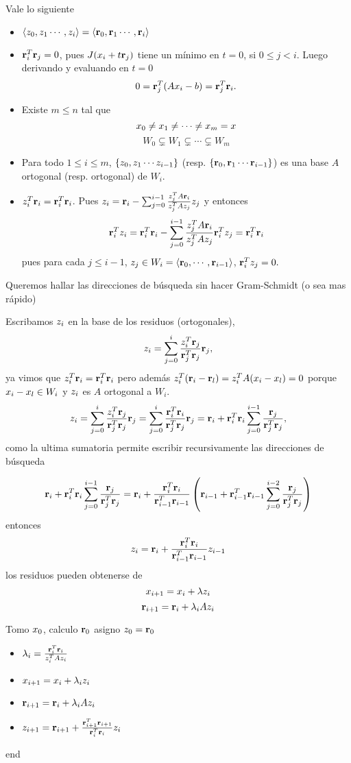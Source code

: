 Vale lo siguiente
\begin{itemize}
 \item $\langle \zb_0, \zb_1\cdots ,\zb_i\rangle =\langle \rb_0, \rb_1\cdots ,
 \rb_i\rangle$
\item $\mathbf{r}_i^T\mathbf{r}_j=0$, pues $J(\xb_i+t\rb_j)$ tiene un mínimo en $t=0$, si $0\le j<i$. Luego derivando y evaluando en $t=0$
$$
0=\rb_j^T(\Ab\xb_i-\bb)=\rb_j^T\rb_i.
$$
\item Existe $m\le n$ tal que
$$
\xb_0\neq \xb_1\neq \cdots \neq \xb_m= \xb
$$
$$
W_{0}\subsetneq W_1\subsetneq \cdots \subsetneq W_m
$$

\item Para todo $1\le i\le m$, $\{ \zb_0,\zb_1\cdots \zb_{i-1}\}$ (resp. $\{ \mathbf{r}_0,\mathbf{r}_1\cdots \mathbf{r}_{i-1}\}$) es una base $A$ ortogonal (resp. ortogonal) de $W_i$.
 \item $\zb_i^T\rb_i=\rb_i^T\rb_i$. Pues
 $\zb_i=\rb_i-\sum_{j=0}^{i-1}\frac{\zb_j^T\Ab\rb_i}{\zb_j^T\Ab\zb_j}\zb_j$ y entonces
 $$\rb_i^T\zb_i=\rb_i^T\rb_i-\sum_{j=0}^{i-1}\frac{\zb_j^T\Ab\rb_i}{\zb_j^T\Ab\zb_j}\rb_i^T\zb_j=\rb_i^T\rb_i$$
 pues para cada $j\le i-1$,
 $\zb_j\in W_i=\langle \rb_0,\cdots,\rb_{i-1}\rangle$, $\rb_i^T\zb_j=0.$
 \end{itemize}


 Queremos hallar las direcciones de búsqueda sin hacer Gram-Schmidt (o sea mas rápido)

Escribamos $\zb_i$ en la base de los residuos (ortogonales),
$$
\zb_i=\sum_{j=0}^{i}\frac{\zb_i^T\rb_j}{\rb_j^T\rb_j}\rb_j,
$$
ya vimos que
$\zb_i^T\rb_i=\rb_i^T\rb_i$
pero además
$\zb_i^T(\rb_i-\rb_l)=\zb_i^T\Ab(\xb_i-\xb_l)=0$ porque $\xb_i-\xb_l\in W_i$ y $\zb_i$ es $A$ ortogonal a $W_i$.
$$
\zb_i=\sum_{j=0}^{i}\frac{\zb_i^T\rb_j}{\rb_j^T\rb_j}\rb_j=\sum_{j=0}^{i}\frac{\rb_i^T\rb_i}{\rb_j^T\rb_j}\rb_j=\rb_i + \rb_i^T\rb_i\sum_{j=0}^{i-1}\frac{\rb_j}{\rb_j^T\rb_j},
$$
como la ultima sumatoria permite escribir recursivamente las direcciones de búsqueda

$$
\mathbf{r}_i + \mathbf{r}_i^T\mathbf{r}_i\sum_{j=0}^{i-1}\frac{\mathbf{r}_j}{\mathbf{r}_j^T\mathbf{r}_j}=\mathbf{r}_i + \frac{\mathbf{r}_i^T\mathbf{r}_i}{\mathbf{r}_{i-1}^T\mathbf{r}_{i-1}}\left( \mathbf{r}_{i-1}+\mathbf{r}_{i-1}^T\mathbf{r}_{i-1}\sum_{j=0}^{i-2}\frac{\mathbf{r}_j}{\mathbf{r}_j^T\mathbf{r}_j}\right)
$$
entonces
$$
\zb_i=\rb_i+\frac{\rb_i^T\rb_i}{\rb_{i-1}^T\rb_{i-1}}\zb_{i-1}
$$
los residuos  pueden obtenerse de
$$\xb_{i+1}=\xb_i+\lambda \zb_i$$
$$
\rb_{i+1}=\rb_i+\lambda_i\Ab\zb_i
$$

Tomo $\xb_0$, calculo $\mathbf{r}_0$ asigno $\zb_0=\rb_0$

\begin{itemize}
 \item $\lambda_i=\frac{\rb_i^T\rb_i}{\zb_{i}^T\Ab\zb_i}$
 \item $\xb_{i+1}=\xb_{i}+\lambda_i \zb_i$
 \item $\rb_{i+1}=\rb_i+\lambda_i\Ab\zb_i$
\item $
\zb_{i+1}=\rb_{i+1}+\frac{\rb_{i+1}^T\rb_{i+1}}{\rb_{i}^T\rb_{i}}\zb_{i}
$

\end{itemize}
end

